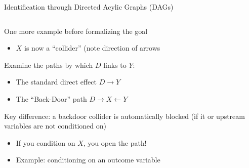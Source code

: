 \documentclass[notes,11pt, aspectratio=169]{beamer}
\newenvironment{wideitemize}{\itemize\addtolength{\itemsep}{10pt}}{\enditemize}
\begin{document}
\begin{frame}{Identification through Directed Acylic Graphs (DAGs)}
\begin{columns}[T] %
  \begin{column}{.6\textwidth}
    \begin{wideitemize}
    \item One more example before formalizing the goal
      \begin{itemize}
      \item $X$ is now a ``collider'' (note direction of arrows
      \end{itemize}
    \item Examine the paths by which $D$ links to $Y$:
      \begin{itemize}
      \item The standard direct effect $D \rightarrow Y$
      \item The ``Back-Door'' path $D \rightarrow X \leftarrow Y$
      \end{itemize}
    \item Key difference: a backdoor collider is automatically blocked
      (if it or upstream variables are not conditioned on)
      \begin{itemize}
      \item If you condition on $X$, you open the path!
      \item Example: conditioning on an outcome variable
      \end{itemize}
    \end{wideitemize}
  \end{column}%
  \hfill%
  \begin{column}{.5\textwidth}
    \begin{center}
    \end{center}
  \end{column}
\end{columns}
\end{frame}
\end{document}
